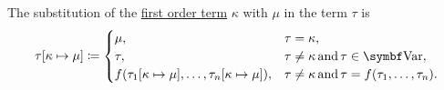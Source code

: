 \begin{definition}
\begin{defenum}
     The substitution of the \hyperref[def:first_order_syntax/term]{first order term} \( \kappa \) with \( \mu \) in the term \( \tau \) is
    \begin{equation}\label{eq:def:first_order_substitution/term_in_term}
      \tau[\kappa \mapsto \mu] \coloneqq \begin{cases}
        \mu,                                                               &\tau = \kappa, \\
        \tau,                                                              &\tau \neq \kappa \T{and} \tau \in \bfop{Var}, \\
        f(\tau_1[\kappa \mapsto \mu], \ldots, \tau_n[\kappa \mapsto \mu]), &\tau \neq \kappa \T{and} \tau = f(\tau_1, \ldots, \tau_n).
      \end{cases}
    \end{equation}


\end{defenum}
\end{definition}
